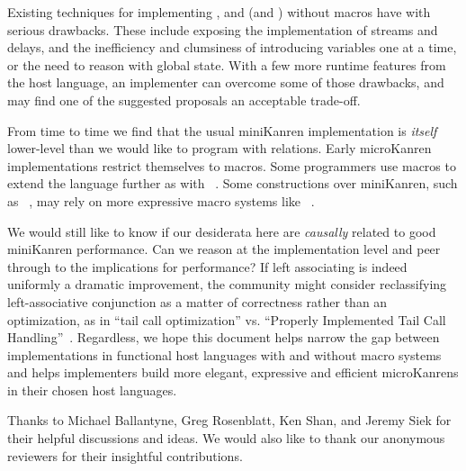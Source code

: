 \documentclass[sigplan,balance=true,pbalance=true,natbib=false]{acmart}
\begin{document}
Existing techniques for
implementing , 
and  (and ) without macros have with
serious drawbacks. These include exposing the implementation of
streams and delays, and the inefficiency and clumsiness of introducing
variables one at a time, or the need to reason with global state. With
a few more runtime features from the host language, an implementer can
overcome some of those drawbacks, and may find one of the suggested
proposals an acceptable trade-off.

From time to time we find that the usual miniKanren implementation is
\emph{itself} lower-level than we would like to program with
relations. Early microKanren implementations restrict themselves
to  macros. Some programmers use macros to
extend the language further as
with ~\cite{keep2009pattern}. Some constructions
over miniKanren, such
as ~\cite{ballantyne2020macros}, may rely on
more expressive macro systems
like ~\cite{culpepper2012fortifying}.

We would still like to know if our desiderata here are \emph{causally}
related to good miniKanren performance. Can we reason at the
implementation level and peer through to the implications for
performance? If left associating  is indeed uniformly
a dramatic improvement, the community might consider reclassifying
left-associative conjunction as a matter of correctness rather than an
optimization, as in \enquote{tail call optimization} vs.
\enquote{Properly Implemented Tail Call
  Handling}~\cite{felleisen2014requestions}. Regardless, we hope this
document helps narrow the gap between implementations in functional
host languages with and without macro systems and helps implementers
build more elegant, expressive and efficient microKanrens in their
chosen host languages.

\begin{acks}

  Thanks to Michael Ballantyne, Greg Rosenblatt, Ken Shan, and Jeremy
  Siek for their helpful discussions and ideas. We would also like to
  thank our anonymous reviewers for their insightful contributions.

\end{acks}

\printbibliography{}
\end{document}
